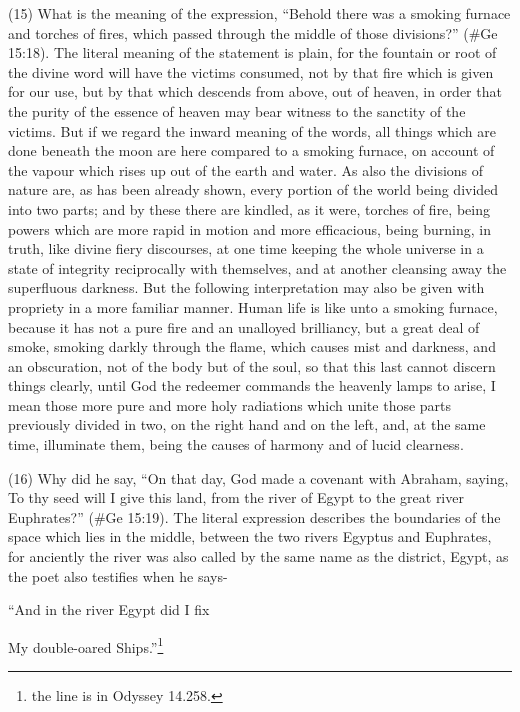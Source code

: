 (15) What is the meaning of the expression, ``Behold there was a smoking furnace and torches of
fires, which passed through the middle of those divisions?'' (\#Ge 15:18). The literal meaning of
the statement is plain, for the fountain or root of the divine word will have the victims consumed, not
by that fire which is given for our use, but by that which descends from above, out of heaven, in
order that the purity of the essence of heaven may bear witness to the sanctity of the victims. But if
we regard the inward meaning of the words, all things which are done beneath the moon are here
compared to a smoking furnace, on account of the vapour which rises up out of the earth and
water. As also the divisions of nature are, as has been already shown, every portion of the world
being divided into two parts; and by these there are kindled, as it were, torches of fire, being
powers which are more rapid in motion and more efficacious, being burning, in truth, like divine
fiery discourses, at one time keeping the whole universe in a state of integrity reciprocally with
themselves, and at another cleansing away the superfluous darkness. But the following
interpretation may also be given with propriety in a more familiar manner. Human life is like unto a
smoking furnace, because it has not a pure fire and an unalloyed brilliancy, but a great deal of
smoke, smoking darkly through the flame, which causes mist and darkness, and an obscuration,
not of the body but of the soul, so that this last cannot discern things clearly, until God the
redeemer commands the heavenly lamps to arise, I mean those more pure and more holy
radiations which unite those parts previously divided in two, on the right hand and on the left, and,
at the same time, illuminate them, being the causes of harmony and of lucid clearness.

(16) Why did he say, ``On that day, God made a covenant with Abraham, saying, To thy seed will I
give this land, from the river of Egypt to the great river Euphrates?'' (\#Ge 15:19). The literal
expression describes the boundaries of the space which lies in the middle, between the two rivers
Egyptus and Euphrates, for anciently the river was also called by the same name as the district,
Egypt, as the poet also testifies when he says-

``And in the river Egypt did I fix

My double-oared Ships.''\footnote{the line is in Odyssey 14.258.}

